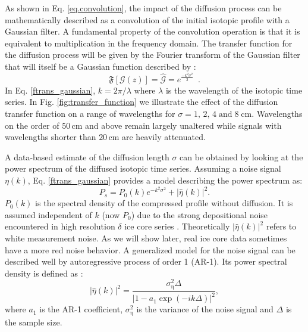 \documentclass[11pt, draftcls, onecolumn]{IEEEtran} %
\numberwithin{equation}{section}
\numberwithin{table}{section}
\numberwithin{figure}{section}
\begin{document}
As shown in Eq. \ref{eq.convolution}, the impact of the diffusion process can be mathematically 
described as a convolution of the initial isotopic profile with a Gaussian filter.
A fundamental property of the convolution operation is that it is equivalent to  multiplication
in the frequency domain. The transfer function for the diffusion process will be given by the
Fourier transform of the Gaussian filter that will itself be a Gaussian function described by 
\citep{Abramowitz1964, Gkinis2014}:
\begin{equation}
\label{ftrans_gaussian}
\mathfrak{F}
[ \mathcal{G} (z) ] =
\hat{\mathcal{G}} = {e}^{\frac{-k^2 \sigma^2}{2}} {} \enspace .
\end{equation}%
In Eq. \ref{ftrans_gaussian}, $k = 2\pi / \lambda$ where $\lambda$ is the wavelength of the 
isotopic time series. 
In Fig. \ref{fig:transfer_function} we illustrate the effect of the diffusion transfer function on a range of wavelengths
for $\sigma = 1,\, 2,\, 4\; \mathrm{and} \;8 \;	\mathrm{cm.}$ 
Wavelengths on the order of $50\,\mathrm{cm}$ and above remain largely unaltered while signals with 
wavelengths shorter than $20\,\mathrm{cm}$ are heavily attenuated. 


A data-based estimate of the diffusion length $\sigma$ can be obtained by looking at the power spectrum of the diffused 
isotopic time series. Assuming a noise signal $\eta \left( k \right)$, 
Eq. \ref{ftrans_gaussian} provides a model describing the power spectrum as: 
\begin{equation}
P_s =    P_0(k) {e}^{-k^2 \sigma^2} + {\vert \hat{\eta} \left( k \right) \vert} ^{2}. 
\label{eq:powerspectrum}
\end{equation}
$P_0(k)$ is the spectral density of the compressed profile without diffusion. 
It is assumed independent of $k$ (now $P_0$) due to the strong depositional noise 
encountered in high resolution $\delta$ ice core series \citep{Johnsen2000}. 
Theoretically $|\hat{\eta}(k )|^2$ refers to white measurement noise.
As we will show later, real ice core data sometimes have a more red noise behavior.
A generalized model for the noise signal can be described well by autoregressive process of order 1 (AR-1).
Its power spectral density is defined as \citep{Kay1981}:
\begin{equation}
|\hat{\eta}(k )|^2 = \frac{\sigma_{\mathrm{\eta}}^2 \Delta}
 {\left| 1-a_1 \exp{\left( -i k  \Delta \right) } \right|^2} {},
\end{equation}
where $a_1$ is the AR-1 coefficient, $\sigma_{\mathrm{\eta}}^2$ is the variance of the noise signal 
and $\Delta$ is the sample size.
\end{document}
